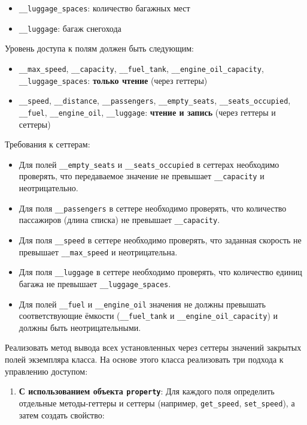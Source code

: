 \begin{enumerate}
\begin{itemize}
    \item \texttt{\_\_luggage\_spaces}: количество багажных мест  
    \item \texttt{\_\_luggage}: багаж снегохода  
\end{itemize}
Уровень доступа к полям должен быть следующим:
\begin{itemize}
    \item \texttt{\_\_max\_speed}, \texttt{\_\_capacity}, \texttt{\_\_fuel\_tank}, \texttt{\_\_engine\_oil\_capacity}, \texttt{\_\_luggage\_spaces}: \textbf{только чтение} (через геттеры)  
    \item \texttt{\_\_speed}, \texttt{\_\_distance}, \texttt{\_\_passengers}, \texttt{\_\_empty\_seats}, \texttt{\_\_seats\_occupied}, \texttt{\_\_fuel}, \texttt{\_\_engine\_oil}, \texttt{\_\_luggage}: \textbf{чтение и запись} (через геттеры и сеттеры)
\end{itemize}
Требования к сеттерам:
\begin{itemize}
    \item Для полей \texttt{\_\_empty\_seats} и \texttt{\_\_seats\_occupied} в сеттерах необходимо проверять, что передаваемое значение не превышает \texttt{\_\_capacity} и неотрицательно.  
    \item Для поля \texttt{\_\_passengers} в сеттере необходимо проверять, что количество пассажиров (длина списка) не превышает \texttt{\_\_capacity}.  
    \item Для поля \texttt{\_\_speed} в сеттере необходимо проверять, что заданная скорость не превышает \texttt{\_\_max\_speed} и неотрицательна.  
    \item Для поля \texttt{\_\_luggage} в сеттере необходимо проверять, что количество единиц багажа не превышает \texttt{\_\_luggage\_spaces}.
    \item Для полей \texttt{\_\_fuel} и \texttt{\_\_engine\_oil} значения не должны превышать соответствующие ёмкости (\texttt{\_\_fuel\_tank} и \texttt{\_\_engine\_oil\_capacity}) и должны быть неотрицательными.
\end{itemize}
Реализовать метод вывода всех установленных через сеттеры значений закрытых полей экземпляра класса.
На основе этого класса реализовать три подхода к управлению доступом:
\begin{enumerate}
    \item \textbf{С использованием объекта \texttt{property}}:  
    Для каждого поля определить отдельные методы-геттеры и сеттеры (например, \texttt{get\_speed}, \texttt{set\_speed}), а затем создать свойство:  
    \begin{verbatim}

\end{verbatim}
\end{enumerate}
\end{enumerate}
